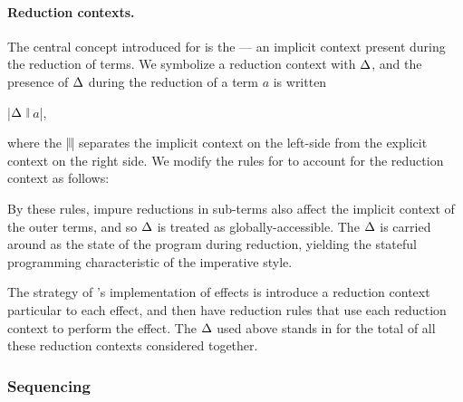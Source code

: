 \paragraph{Reduction contexts.}
The central concept introduced for \LangB is the  --- an implicit context present during the reduction of terms.
We symbolize a reduction context with $\Delta$, and the presence of $\Delta$ during the reduction of a term $a$ is written
\begin{display}
  \code|$\Delta$ 𝄁 $a$|,
\end{display}
where the \code|𝄁| separates the implicit context on the left-side from the explicit context on the right side.
We modify the  rules for \LangB to account for the reduction context as follows:

By these rules, impure reductions in sub-terms also affect the implicit context of the outer terms, and so $\Delta$ is treated as globally-accessible.
The $\Delta$ is carried around as the state of the program during reduction, yielding the stateful programming characteristic of the imperative style.

The strategy of \LangB's implementation of effects is introduce a reduction context particular to each effect, and then have reduction rules that use each reduction context to perform the effect.
The $\Delta$ used above stands in for the total of all these reduction contexts considered together.

\subsubsection{Sequencing}


